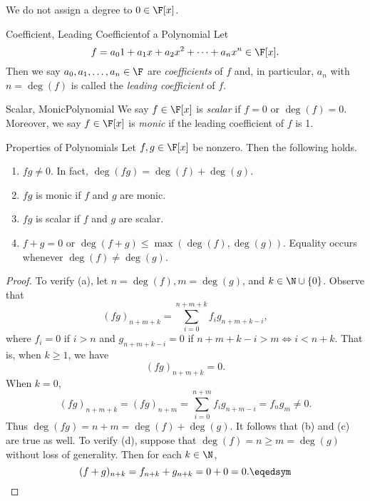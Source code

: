 \documentclass[linearalgebra]{subfiles}
\begin{document}
    \begin{remark}
        We do not assign a degree to $0\in \F[x]$.
    \end{remark}

    \begin{definition}{Coefficient, Leading Coefficient}{of a Polynomial}
        Let
        \begin{equation*}
            f = a_0 1+ a_1x + a_2x^2 + \cdots + a_nx^n\in \F[x].
        \end{equation*}
        Then we say $a_0, a_1, \ldots, a_n\in \F$ are \emph{coefficients} of $f$ and, in particular, $a_n$ with $n=\deg(f)$ is called the \emph{leading coefficient} of $f$.
    \end{definition}

    \begin{definition}{Scalar, Monic}{Polynomial}
        We say $f\in \F[x]$ is \emph{scalar} if $f=0$ or $\deg(f) = 0$. Moreover, we say $f\in\F[x]$ is \emph{monic} if the leading coefficient of $f$ is 1. 
    \end{definition}

    \begin{prop}{Properties of Polynomials}
        Let $f, g\in \F[x]$ be nonzero. Then the following holds.
        \begin{enumerate}
            \item $fg\neq 0$. In fact, $\deg(fg) = \deg(f)+\deg(g)$.
            \item $fg$ is monic if $f$ and $g$ are monic.
            \item $fg$ is scalar if $f$ and $g$ are scalar.
            \item $f+g = 0$ or $\deg(f+g)\leq \max \left( \deg(f), \deg(g) \right)$. Equality occurs whenever $\deg(f)\neq\deg(g)$.
        \end{enumerate}
    \end{prop}

    \begin{proof}
        To verify (a), let $n=\deg(f), m=\deg(g)$, and $k\in \N\cup \left\lbrace 0 \right\rbrace$. Observe that
        \begin{equation*}
            (fg)_{n+m+k} = \sum^{n+m+k}_{i=0} f_ig_{n+m+k-i},
        \end{equation*}
        where $f_i=0$ if $i>n$ and $g_{n+m+k-i}=0$ if $n+m+k-i>m\iff i<n+k$. That is, when $k\geq 1$, we have
        \begin{equation*}
            (fg)_{n+m+k} = 0.
        \end{equation*}
        When $k=0$,
        \begin{equation*}
            (fg)_{n+m+k} = (fg)_{n+m} = \sum^{n+m}_{i=0} f_ig_{n+m-i} = f_ng_m \neq 0.
        \end{equation*}
        Thus $\deg(fg) = n+m = \deg(f) + \deg(g)$. It follows that (b) and (c) are true as well. To verify (d), suppose that $\deg(f) = n \geq m = \deg(g)$ without loss of generality. Then for each $k\in \N$,
        \begin{equation*}
            (f+g)_{n+k} = f_{n+k} + g_{n+k} = 0 + 0 = 0. \eqedsym
        \end{equation*}
    \end{proof}
\end{document}
